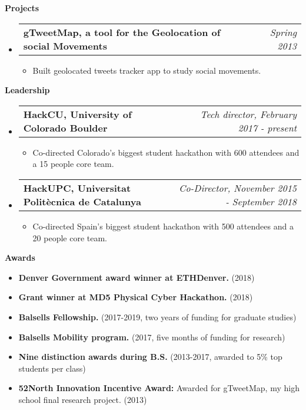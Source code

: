 \documentclass[letterpaper,10pt]{article}
\makeatletter
\newcommand{\resitem}[1]{\item #1 \vspace{-2pt}}
\newcommand{\resheading}[1]{{\large \colorbox{mygrey}{\begin{minipage}{\textwidth}{\textbf{#1 \vphantom{p\^{E}}}}\end{minipage}}}}
\newcommand{\ressubheading}[4]{
\begin{tabular*}{7.0in}{l@{\extracolsep{\fill}}r}
		\textbf{#1} & \textit{#4} \\
\end{tabular*}\vspace{-6pt}}
\makeatother
\begin{document}
\resheading{Projects}
	\begin{itemize}
		\item
			\ressubheading{gTweetMap, a tool for the Geolocation of social Movements}{Barcelona, Spain}{Student}{Spring 2013}
			\begin{itemize}
				\resitem{Built geolocated tweets tracker app to study social movements.}
			\end{itemize}
	\end{itemize}

\resheading{Leadership}
	\begin{itemize}
		\item 
			\ressubheading{HackCU, University of Colorado Boulder}{Boulder, CO}{Tech director}{Tech director, February 2017 - present}
			\begin{itemize}
				\resitem{Co-directed Colorado's biggest student hackathon with 600 attendees and a 15 people core team.}
			\end{itemize}
		\item
			\ressubheading{HackUPC, Universitat Polit\`ecnica de Catalunya}{Barcelona, Spain}{Co-Director and organizer}{Co-Director, November 2015 - September 2018}
			\begin{itemize}
				\resitem{Co-directed Spain's biggest student hackathon with 500 attendees and a 20 people core team.}
			\end{itemize}
	\end{itemize}

\resheading{Awards}
	\begin{itemize}
		\resitem{\textbf{Denver Government award winner at ETHDenver.} (2018)}
		\resitem{\textbf{Grant winner at MD5 Physical Cyber Hackathon.} (2018)}
		\resitem{\textbf{Balsells Fellowship.} (2017-2019, two years of funding for graduate studies)}
		\resitem{\textbf{Balsells Mobility program.} (2017, five months of funding for research)}
		\resitem{\textbf{Nine distinction awards during B.S.} (2013-2017, awarded to 5\% top students per class)}
		\resitem{\textbf{52North Innovation Incentive Award:} Awarded for gTweetMap, my high school final research project. (2013)}
	\end{itemize}

\end{document}
